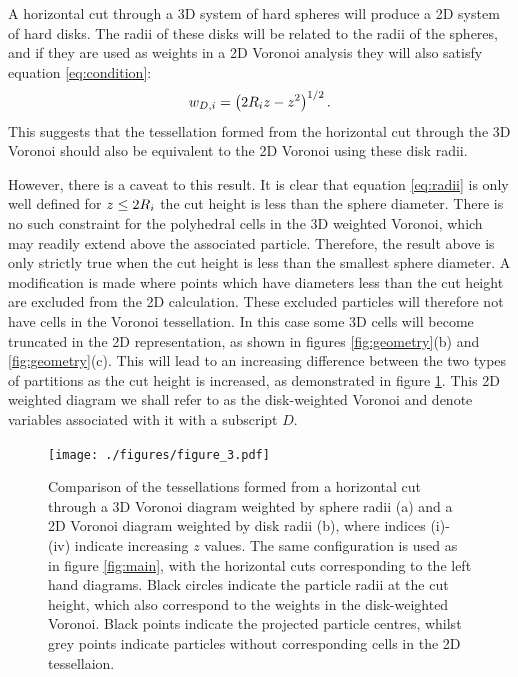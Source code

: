 A horizontal cut through a 3D system of hard spheres will produce a 2D system of hard disks.
The radii of these disks will be related to the radii of the spheres, and if they are used as weights in a 2D Voronoi analysis they will also satisfy equation \eqref{eq:condition}:
\begin{equation}
	\label{eq:radii}
	w_{D,i}  = \left(2R_i z-z^2\right)^{1/2}.
\end{equation}
This suggests that the tessellation formed from the horizontal cut through the 3D Voronoi should also be equivalent to the 2D Voronoi using these disk radii.

However, there is a caveat to this result. 
It is clear that equation \eqref{eq:radii} is only well defined for $z\leq 2R_i$ \ie{} the cut height is less than the sphere diameter.
There is no such constraint for the polyhedral cells in the 3D weighted Voronoi, which may readily extend above the associated particle.
Therefore, the result above is only strictly true when the cut height is less than the smallest sphere diameter.
A modification is made where points which have diameters less than the cut height are excluded from the 2D calculation.
These excluded particles will therefore not have cells in the Voronoi tessellation.
In this case some 3D cells will become truncated in the 2D representation, as shown in figures \ref{fig:geometry}(b) and \ref{fig:geometry}(c).
This will lead to an increasing difference between the two types of partitions as the cut height is increased, as demonstrated in figure \ref{fig:vorocomp}.
This 2D weighted diagram we shall refer to as the disk\--weighted Voronoi and denote variables associated with it with a subscript $D$.

\begin{figure}
	\texttt{[image: ./figures/figure\_3.pdf]}
	\caption{Comparison of the tessellations formed from a horizontal cut through a 3D Voronoi diagram weighted by sphere radii (a) and a 2D Voronoi diagram weighted by disk radii (b), where indices (i)\--(iv) indicate increasing $z$ values.
	The same configuration is used as in figure \ref{fig:main}, with the horizontal cuts corresponding to the left hand diagrams.
	Black circles indicate the particle radii at the cut height, which also correspond to the weights in the disk\--weighted Voronoi. Black points indicate the projected particle centres, whilst grey points indicate particles without corresponding cells in the 2D tessellaion.}
	\label{fig:vorocomp}
\end{figure}


